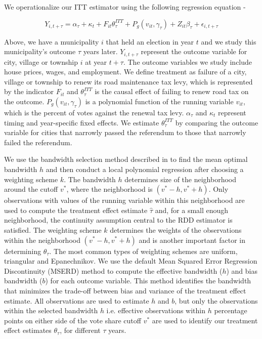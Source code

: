 We operationalize our ITT estimator using the following regression equation -

$$
Y_{i,t+\tau} = \alpha_\tau + \kappa_t + F_{it} \theta_{\tau}^{ITT} + P_g (v_{it}, \gamma_\tau) + Z_{it} \beta_\tau + \epsilon_{i,t + \tau}
$$

Above, we have a municipality $i$ that held an election in year $t$ and we study this municipality's outcome $\tau$ years later. $Y_{i,t+\tau}$ represent the outcome variable for city, village or township $i$ at year $t + \tau$. The outcome variables we study include house prices, wages, and employment. We define treatment as failure of a city, village or township to renew its road maintenance tax levy, which is represented by the indicator $F_{it}$ and $\theta_{\tau}^{ITT}$ is the causal effect of failing to renew road tax on the outcome. $P_g (v_{it}, \gamma_\tau)$ is a polynomial function of the running variable $v_{it}$, which is the percent of votes against the renewal tax levy. $\alpha_\tau$ and $\kappa_t$ represent timing and year-specific fixed effects. We estimate $\theta_{\tau}^{ITT}$ by comparing the outcome variable for cities that narrowly passed the referendum to those that narrowly failed the referendum.        


We use the bandwidth selection method described in \cite{calonico2019regression} to find the mean optimal bandwidth $h$ and then conduct a local polynomial regression after choosing a weighting scheme $k$. The bandwidth $h$ determines size of the neighborhood around the cutoff $v^*$, where the neighborhood is $(v^* - h, v^* + h)$. Only observations with values of the running variable within this neighborhood are used to compute the treatment effect estimate $\hat{\tau}$ and, for a small enough neighborhood, the continuity assumption central to the RDD estimator is satisfied. The weighting scheme $k$ determines the weights of the observations within the neighborhood $(v^* - h, v^* + h)$ and is another important factor in determining $\theta_{\tau}$. The most common types of weighting schemes are uniform, triangular and Epanechnikov. We use the default Mean Squared Error Regression Discontinuity (MSERD) method to compute the effective bandwidth ($h$) and bias bandwidth ($b$) for each outcome variable. This method identifies the bandwidth that minimizes the trade-off between bias and variance of the treatment effect estimate. All observations are used to estimate $h$ and $b$, but only the observations within the selected bandwidth $h$ i.e. effective observations within $h$ percentage points on either side of the vote share cutoff $v^*$ are used to identify our treatment effect estimates $\theta_\tau$, for different $\tau$ years.

